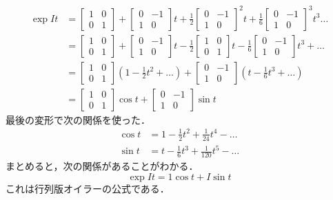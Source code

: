 \documentclass{jsbook}
\begin{document}
\begin{align}
\exp It&=\begin{bmatrix}1&0\\0&1\end{bmatrix}+\begin{bmatrix}0&-1\\1&0\end{bmatrix}t+\frac{1}{2}\begin{bmatrix}0&-1\\1&0\end{bmatrix}^2t+\frac{1}{6}\begin{bmatrix}0&-1\\1&0\end{bmatrix}^3t^3\dots\\
&=\begin{bmatrix}1&0\\0&1\end{bmatrix}+\begin{bmatrix}0&-1\\1&0\end{bmatrix}t-\frac{1}{2}\begin{bmatrix}1&0\\0&1\end{bmatrix}t-\frac{1}{6}\begin{bmatrix}0&-1\\1&0\end{bmatrix}t^3+\dots\\
&=\begin{bmatrix}1&0\\0&1\end{bmatrix}\left(1-\frac{1}{2}t^2+\dots\right)+\begin{bmatrix}0&-1\\1&0\end{bmatrix}\left(t-\frac{1}{6}t^3+\dots\right)\\
&=\begin{bmatrix}1&0\\0&1\end{bmatrix}\cos t+\begin{bmatrix}0&-1\\1&0\end{bmatrix}\sin t
\end{align}
最後の変形で次の関係を使った．
\begin{align}
\cos t&=1-\frac{1}{2}t^2+\frac{1}{24}t^4-\dots\\
\sin t&=t-\frac{1}{6}t^3+\frac{1}{120}t^5-\dots
\end{align}
まとめると，次の関係があることがわかる．
\begin{equation}
\exp It=1\cos t+I\sin t
\end{equation}
これは行列版オイラーの公式である．
\end{document}
